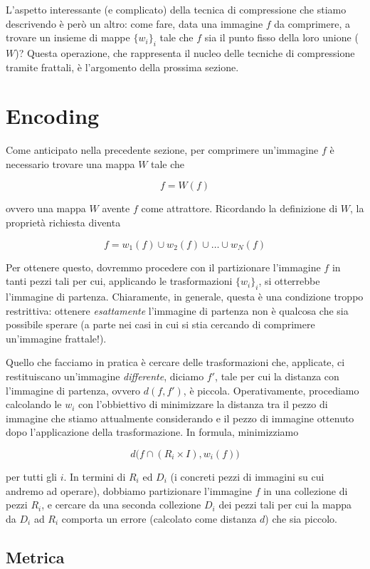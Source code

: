 \documentclass[11pt,a4paper,appendixprefix=true,numbers=noenddot]{scrreprt}
\begin{document}
L'aspetto interessante (e complicato) della tecnica di compressione che stiamo descrivendo è però un altro: come fare, data una immagine $f$ da comprimere, a trovare un insieme di mappe $\{w_i\}_i$ tale che $f$ sia il punto fisso della loro unione ($W$)? Questa operazione, che rappresenta il nucleo delle tecniche di compressione tramite frattali, è l'argomento della prossima sezione.

\section{Encoding}

Come anticipato nella precedente sezione, per comprimere un'immagine $f$ è necessario trovare una mappa $W$ tale che 

\[
f = W(f)
\]

ovvero una mappa $W$ avente $f$ come attrattore. Ricordando la definizione di $W$, la proprietà richiesta diventa

\[
f = w_1(f) \cup w_2(f) \cup \dots \cup w_N(f)
\]

Per ottenere questo, dovremmo procedere con il partizionare l'immagine $f$ in tanti pezzi tali per cui, applicando le trasformazioni $\{w_i\}_i$, si otterrebbe l'immagine di partenza. Chiaramente, in generale, questa è una condizione troppo restrittiva: ottenere \emph{esattamente} l'immagine di partenza non è qualcosa che sia possibile sperare (a parte nei casi in cui si stia cercando di comprimere un'immagine frattale!).

Quello che facciamo in pratica è cercare delle trasformazioni che, applicate, ci restituiscano un'immagine \emph{differente}, diciamo $f'$, tale per cui la distanza con l'immagine di partenza, ovvero $d(f,f')$, è piccola. Operativamente, procediamo calcolando le $w_i$ con l'obbiettivo di minimizzare la distanza tra il pezzo di immagine che stiamo attualmente considerando e il pezzo di immagine ottenuto dopo l'applicazione della trasformazione. In formula, minimizziamo

\[
d\big(f \cap (R_i \times I), w_i(f)\big) 
\]

per tutti gli $i$. In termini di $R_i$ ed $D_i$ (i concreti pezzi di immagini su cui andremo ad operare), dobbiamo partizionare l'immagine $f$ in una collezione di pezzi $R_i$, e cercare da una seconda collezione $D_i$ dei pezzi tali per cui la mappa da $D_i$ ad $R_i$ comporta un errore (calcolato come distanza $d$) che sia piccolo.

\subsection*{Metrica}
\end{document}
